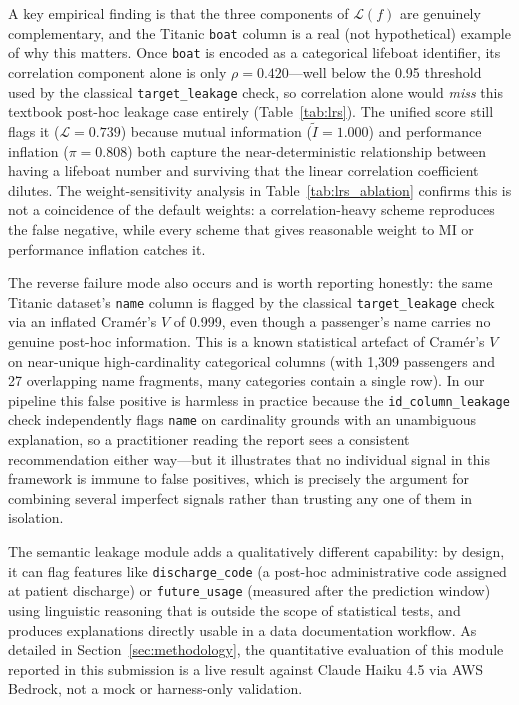 \documentclass[11pt]{article}
\begin{document}
A key empirical finding is that the three components of $\mathcal{L}(f)$ are
genuinely complementary, and the Titanic \texttt{boat} column is a real
(not hypothetical) example of why this matters.  Once \texttt{boat} is
encoded as a categorical lifeboat identifier, its correlation component
alone is only $\rho{=}0.420$---well below the 0.95 threshold used by the
classical \texttt{target\_leakage} check, so correlation alone would
\emph{miss} this textbook post-hoc leakage case entirely
(Table~\ref{tab:lrs}).  The unified score still flags it
($\mathcal{L}{=}0.739$) because mutual information
($\widetilde{I}{=}1.000$) and performance inflation ($\pi{=}0.808$) both
capture the near-deterministic relationship between having a lifeboat
number and surviving that the linear correlation coefficient dilutes.  The
weight-sensitivity analysis in Table~\ref{tab:lrs_ablation} confirms this
is not a coincidence of the default weights: a correlation-heavy scheme
reproduces the false negative, while every scheme that gives reasonable
weight to MI or performance inflation catches it.

The reverse failure mode also occurs and is worth reporting honestly: the
same Titanic dataset's \texttt{name} column is flagged by the classical
\texttt{target\_leakage} check via an inflated Cram\'er's $V$ of 0.999, even
though a passenger's name carries no genuine post-hoc information.  This is
a known statistical artefact of Cram\'er's $V$ on near-unique
high-cardinality categorical columns (with 1,309 passengers and 27
overlapping name fragments, many categories contain a single row).  In our
pipeline this false positive is harmless in practice because the
\texttt{id\_column\_leakage} check independently flags \texttt{name} on
cardinality grounds with an unambiguous explanation, so a practitioner
reading the report sees a consistent recommendation either way---but it
illustrates that no individual signal in this framework is immune to
false positives, which is precisely the argument for combining several
imperfect signals rather than trusting any one of them in isolation.

The semantic leakage module adds a qualitatively different capability: by
design, it can flag features like \texttt{discharge\_code} (a post-hoc
administrative code assigned at patient discharge) or \texttt{future\_usage}
(measured after the prediction window) using linguistic reasoning that is
outside the scope of statistical tests, and produces explanations directly
usable in a data documentation workflow.  As detailed in
Section~\ref{sec:methodology}, the quantitative evaluation of this module
reported in this submission is a live result against Claude Haiku 4.5 via
AWS Bedrock, not a mock or harness-only validation.
\end{document}
